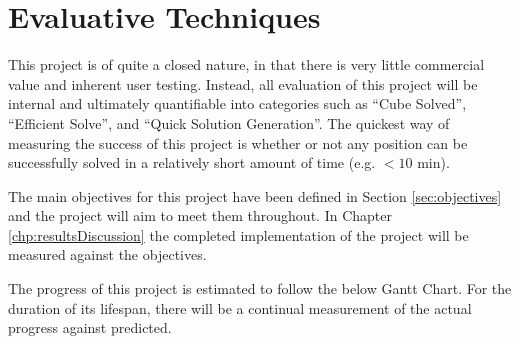 \documentclass{report}
\begin{document}
    \section{Evaluative Techniques} \label{sec:evalTechniques}
    
    This project is of quite a closed nature, in that there is very little commercial value and inherent user testing. Instead, all evaluation of this project will be internal and ultimately quantifiable into categories such as \enquote{Cube Solved}, \enquote{Efficient Solve}, and \enquote{Quick Solution Generation}. The quickest way of measuring the success of this project is whether or not any position can be successfully solved in a relatively short amount of time (e.g. $<10$ \si{\minute}). 
    
    The main objectives for this project have been defined in Section \ref{sec:objectives} and the project will aim to meet them throughout. In Chapter \ref{chp:resultsDiscussion} the completed implementation of the project will be measured against the objectives.
    
    The progress of this project is estimated to follow the below Gantt Chart. For the duration of its lifespan, there will be a continual measurement of the actual progress against predicted.
    
\end{document}
